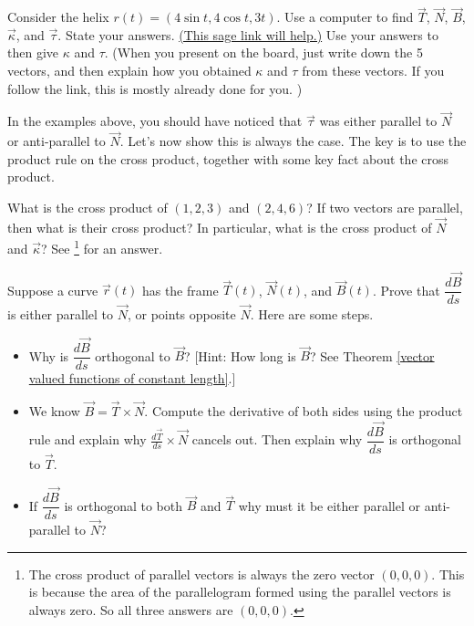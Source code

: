 \begin{problem*}[Optional]
 Consider the helix $r(t)=(4\sin t, 4\cos t, 3t)$. Use a computer to find $\vec T$, $\vec N$, $\vec B$, $\vec \kappa$, and $\vec \tau$. State your answers. \href{\sageurlforcurvature}{(This sage link will help.)} Use your answers to then give $\kappa$ and $\tau$. (When you present on the board, just write down the 5 vectors, and then explain how you obtained $\kappa$ and $\tau$ from these vectors. If you follow the link, this is mostly already done for you. )
\end{problem*}

In the examples above, you should have noticed that $\vec \tau$ was either parallel to $\vec N$ or anti-parallel to $\vec N$.  Let's now show this is always the case. The key is to use the product rule on the cross product, together with some key fact about the cross product.
\begin{review*}
 What is the cross product of $(1,2,3)$ and $(2,4,6)$?  If two vectors are parallel, then what is their cross product?  In particular, what is the cross product of $\vec N$ and $\vec \kappa$? See \footnote{The cross product of parallel vectors is always the zero vector $(0,0,0)$. This is because the area of the parallelogram formed using the parallel vectors is always zero. So all three answers are $(0,0,0)$.} for an answer.
\end{review*}


\begin{problem*}[Optional] %
 Suppose a curve $\vec r(t)$ has the frame $\vec T(t)$, $\vec N(t)$, and $\vec B(t)$. Prove that $\dfrac{d\vec B}{ds}$ is either parallel to $\vec N$, or points opposite $\vec N$. Here are some steps.
 \begin{itemize}
  \item Why is $\dfrac{d\vec B}{ds}$ orthogonal to $\vec B$? [Hint: How long is $\vec B$? See Theorem \ref{vector valued functions of constant length}.]
  \item We know $\vec B=\vec T\times \vec N$. Compute the derivative of both sides using the product rule and explain why $\frac{d\vec T}{ds}\times \vec N$ cancels out. Then explain why $\dfrac{d\vec B}{ds}$ is orthogonal to $\vec T$.
  \item If $\dfrac{d\vec B}{ds}$ is orthogonal to both $\vec B$ and $\vec T$ why must it be either parallel or anti-parallel to $\vec N$?
 \end{itemize}
\end{problem*}





